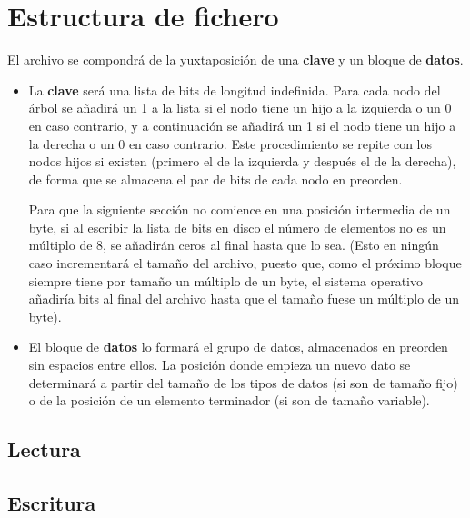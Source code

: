\documentclass{article}
\begin{document}
\section{Estructura de fichero}

El archivo se compondrá de la yuxtaposición de una \textbf{clave} y un
bloque de \textbf{datos}.

\begin{itemize}
	\item La \textbf{clave} será una lista de bits de longitud indefinida.
  Para cada nodo del árbol se añadirá un 1 a la lista si el nodo tiene un hijo a
  la izquierda o un 0 en caso contrario, y a continuación se añadirá un 1 si el
  nodo tiene un hijo a la derecha o un 0 en caso contrario. Este procedimiento
  se repite con los nodos hijos si existen (primero el de la izquierda y después
  el de la derecha), de forma que se almacena el par de bits de cada nodo en preorden.

  Para que la siguiente sección no comience en una posición intermedia de un byte,
  si al escribir la lista de bits en disco el número de elementos no es un múltiplo
  de 8, se añadirán ceros al final hasta que lo sea. (Esto en ningún caso
  incrementará el tamaño del archivo, puesto que, como el próximo bloque siempre
  tiene por tamaño un múltiplo de un byte, el sistema operativo añadiría bits al
  final del archivo hasta que el tamaño fuese un múltiplo de un byte).
	\item El bloque de \textbf{datos} lo formará el grupo de datos, almacenados
  en preorden sin espacios entre ellos. La posición donde empieza un nuevo dato
  se determinará a partir del tamaño de los tipos de datos (si son de tamaño fijo)
  o de la posición de un elemento terminador (si son de tamaño variable).
\end{itemize}

\subsection{Lectura}

\subsection{Escritura}
\end{document}
